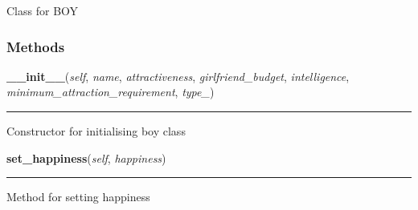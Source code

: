 Class for BOY



  \subsubsection{Methods}

    \label{boy:Boy:__init__}

    \vspace{0.5ex}

\hspace{.8\funcindent}\begin{boxedminipage}{\funcwidth}

    \raggedright \textbf{\_\_init\_\_}(\textit{self}, \textit{name}, \textit{attractiveness}, \textit{girlfriend\_budget}, \textit{intelligence}, \textit{minimum\_attraction\_requirement}, \textit{type\_})

    \vspace{-1.5ex}

    \rule{\textwidth}{0.5\fboxrule}
\setlength{\parskip}{2ex}
    Constructor for initialising boy class

\setlength{\parskip}{1ex}
    \end{boxedminipage}

    \label{boy:Boy:set_happiness}

    \vspace{0.5ex}

\hspace{.8\funcindent}\begin{boxedminipage}{\funcwidth}

    \raggedright \textbf{set\_happiness}(\textit{self}, \textit{happiness})

    \vspace{-1.5ex}

    \rule{\textwidth}{0.5\fboxrule}
\setlength{\parskip}{2ex}
    Method for setting happiness

\setlength{\parskip}{1ex}
    \end{boxedminipage}

    \label{boy:Boy:set_girlfriend}

